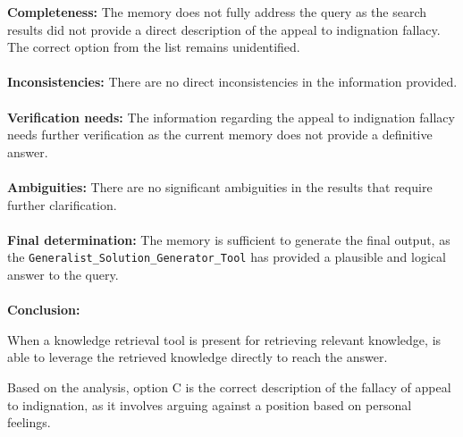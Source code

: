 \begin{plannerbox}

\textbf{Completeness:}
The memory does not fully address the query as the search results did not provide a direct description of the appeal to indignation fallacy. The correct option from the list remains unidentified.
\\\\
\textbf{Inconsistencies:}
There are no direct inconsistencies in the information provided.
\\\\
\textbf{Verification needs:}
The information regarding the appeal to indignation fallacy needs further verification as the current memory does not provide a definitive answer.
\\\\
\textbf{Ambiguities:}
 There are no significant ambiguities in the results that require further clarification.
\\\\
\textbf{Final determination:}
The memory is sufficient to generate the final output, as the \texttt{Generalist\_Solution\_Generator\_Tool} has provided a plausible and logical answer to the query.
\\\\
\textbf{Conclusion:} 
\end{plannerbox}

When a knowledge retrieval tool is present for retrieving relevant knowledge, \model is able to leverage the retrieved knowledge directly to reach the answer.

\begin{answerbox}
Based on the analysis, option C is the correct description of the fallacy of appeal to indignation, as it involves arguing against a position based on personal feelings.
\end{answerbox}

